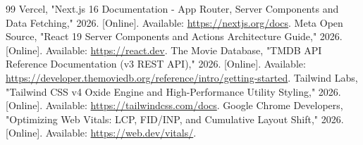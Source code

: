 \documentclass[12pt,a4paper]{extarticle}
\begin{document}
\vspace{0.2cm}

\begin{thebibliography}{99}
\fontsize{9}{12}\selectfont
\setlength{\itemsep}{1.5pt}
 Vercel, "Next.js 16 Documentation - App Router, Server Components and Data Fetching," 2026. [Online]. Available: \url{https://nextjs.org/docs}.
 Meta Open Source, "React 19 Server Components and Actions Architecture Guide," 2026. [Online]. Available: \url{https://react.dev}.
 The Movie Database, "TMDB API Reference Documentation (v3 REST API)," 2026. [Online]. Available: \url{https://developer.themoviedb.org/reference/intro/getting-started}.
 Tailwind Labs, "Tailwind CSS v4 Oxide Engine and High-Performance Utility Styling," 2026. [Online]. Available: \url{https://tailwindcss.com/docs}.
 Google Chrome Developers, "Optimizing Web Vitals: LCP, FID/INP, and Cumulative Layout Shift," 2026. [Online]. Available: \url{https://web.dev/vitals/}.
\end{thebibliography}
\end{document}
